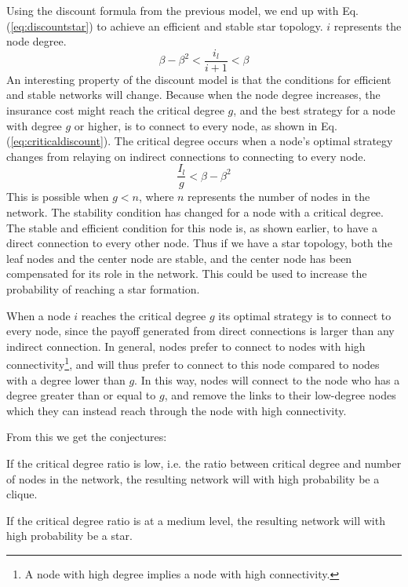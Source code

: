 Using the discount formula from the previous model, we end up with Eq.(\ref{eq:discountstar}) to achieve an efficient and stable star topology. $i$ represents the node degree.
\begin{equation}
\beta-\beta^2<\frac{i_{l}}{i+1}< \beta
\label{eq:discountstar}
\end{equation}
An interesting property of the discount model is that the conditions for efficient and stable networks will change. Because
when the node degree increases, the insurance cost might reach the critical degree $g$, and the best strategy for a node with degree $g$ or higher, is to connect to every node, as shown in Eq.(\ref{eq:criticaldiscount}). The critical degree occurs when a node's optimal strategy changes from relaying on indirect connections to connecting to every node. 
\begin{equation}
\frac{I_{l}}{g}<\beta-\beta^2
\label{eq:criticaldiscount}
\end{equation}
This is possible when $g<n$, where $n$ represents the number of nodes in the network.
The stability condition has changed for a node with a critical degree. The stable and efficient condition for this node is, as shown earlier, to have a direct connection to every other node. Thus if we have a star topology, both the leaf nodes and the center node are stable, and the center node has been compensated for its role in the network. This could be used to increase the probability of reaching a star formation. 

When a node $i$ reaches the critical degree $g$ its optimal strategy is to connect to every node, since the payoff generated from direct connections is larger than any indirect connection. In general, nodes prefer to connect to nodes with high connectivity\footnote{A node with high degree implies a node with high connectivity.}, and will thus prefer to connect to this node compared to nodes with a degree lower than $g$. In this way, nodes will connect to the node who has a degree greater than or equal to $g$, and remove the links to their low-degree nodes which they can instead reach through the node with high connectivity.

From this we get the conjectures:
\begin{cnj}
If the critical degree ratio is low, i.e. the ratio between critical degree and number of nodes in the network, the resulting network will with high probability be a clique.
\label{prop:clique}
\end{cnj} 

\begin{cnj}
If the critical degree ratio is at a medium level, the resulting network will with high probability be a star. 
\label{prop:star}
\end{cnj}

